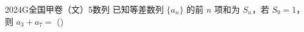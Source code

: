 
\begin{problem}{2024}{G}{全国甲卷（文）}{5}{数列}
已知等差数列 $\{a_n\}$ 的前 $n$ 项和为 $S_n$，若 $S_9=1$，则 $a_3+a_7=$
(\hspace{1cm})
\begin{choices}
\end{choices}
\end{problem}
